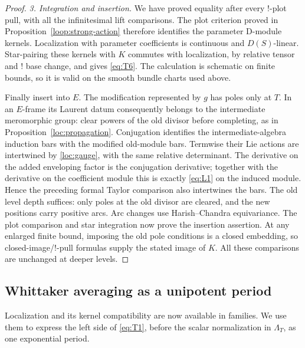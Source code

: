\begin{proof}
\emph{3. Integration and insertion.}
We have proved equality after every $!$-plot pull, with all the
infinitesimal lift comparisons.  The plot criterion proved in
Proposition~\ref{loop:strong-action} therefore identifies the parameter D-module kernels.  Localization
with parameter coefficients is continuous and $D(S)$-linear.
Star-pairing these kernels with $K$ commutes with localization, by
relative tensor and $!$ base change, and gives \eqref{eq:T6}.  The
calculation is schematic on finite bounds, so it is valid on the
smooth bundle charts used above.

Finally insert into $E$.  The modification represented by $g$ has
poles only at $T$.  In an $E$-frame its Laurent datum consequently
belongs to the intermediate meromorphic group: clear powers of the
old divisor before completing, as in
Proposition~\ref{loc:propagation}.  Conjugation identifies the
intermediate-algebra induction bars with the modified old-module
bars.  Termwise their Lie actions are intertwined by
\eqref{loc:gauge}, with the same relative determinant.  The derivative
on the added enveloping factor is the conjugation derivative; together
with the derivative on the coefficient module this is exactly
\eqref{eq:L1} on the induced module.  Hence the preceding formal Taylor
comparison also intertwines the bars.  The old level depth suffices:
only poles at the old divisor are cleared, and the new positions
carry positive arcs.  Arc changes use Harish--Chandra equivariance.
The plot comparison and star integration now prove the insertion
assertion.  At any enlarged finite bound, imposing the old pole
conditions is a closed embedding, so closed-image/$!$-pull formulas
supply the stated image of $K$.  All these comparisons are unchanged
at deeper levels.
\end{proof}

\subsection{Whittaker averaging as a unipotent period}

Localization and its kernel compatibility are now available in
families.  We use them to express the left side of \eqref{eq:T1},
before the scalar normalization in $\Lambda_T$, as one exponential
period.

